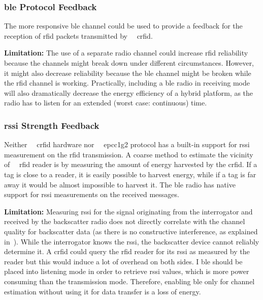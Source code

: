 \documentclass[conference,letterpaper,twoside,final,10pt]{IEEEtran}
\begin{document}
\subsubsection{\acs{ble} Protocol Feedback}
\label{sec:feedback/ble}

The more responsive \ac{ble} channel could be used to provide a feedback for the reception of \ac{rfid} packets transmitted by {~~}\ac{crfid}.

\textbf{Limitation:}
The use of a separate radio channel could increase \ac{rfid} reliability because the channels might break down under different circumstances. However, it might also decrease reliability because the \ac{ble} channel might be broken while the \ac{rfid} channel is working.
Practically, including a \ac{ble} radio in receiving mode will also dramatically decrease the energy efficiency of a hybrid platform, as the radio has to listen for an extended (worst case: continuous) time.

\subsubsection{\acs{rssi} Strength Feedback}
\label{sec:feedback/rssi}

Neither {~~}\ac{crfid} hardware nor {~~}\ac{epcc1g2} protocol has a built-in support for \ac{rssi} measurement on the \ac{rfid} transmission.
A coarse method to estimate the vicinity of {~~}\ac{rfid} reader is by measuring the amount of energy harvested by the \ac{crfid}.
If a tag is close to a reader, it is easily possible to harvest energy, while if a tag is far away it would be almost impossible to harvest it.
The \ac{ble} radio has native support for \ac{rssi} measurements on the received messages.

\textbf{Limitation:}
Measuring \ac{rssi} for the signal originating from the interrogator and received by the backscatter radio does not directly correlate with the channel quality for backscatter data (as there is no constructive interference, as explained in~).
While the interrogator knows the \ac{rssi}, the backscatter device cannot reliably determine it.
A \ac{crfid} could query the \ac{rfid} reader for its \ac{rssi} as measured by the reader but this would induce a lot of overhead on both sides. 
I
\ac{ble} should be placed into listening mode in order to retrieve \ac{rssi} values, which is more power consuming than the transmission mode.
Therefore, enabling \ac{ble} only for channel estimation without using it for data transfer is a loss of energy.
\end{document}
